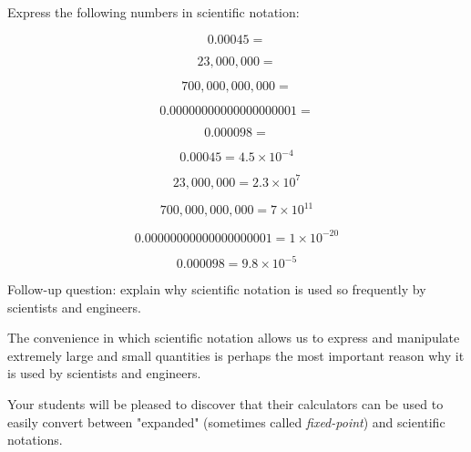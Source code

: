 

Express the following numbers in scientific notation:

$$0.00045 = $$

$$23,000,000 = $$

$$700,000,000,000 = $$

$$0.00000000000000000001 = $$

$$0.000098 = $$







$$0.00045 = 4.5 \times 10^{-4}$$

$$23,000,000 = 2.3 \times 10^{7}$$

$$700,000,000,000 = 7 \times 10^{11}$$

$$0.00000000000000000001 = 1 \times 10^{-20}$$

$$0.000098 = 9.8 \times 10^{-5}$$

\vskip 10pt

Follow-up question: explain why scientific notation is used so frequently by scientists and engineers.







The convenience in which scientific notation allows us to express and manipulate extremely large and small quantities is perhaps the most important reason why it is used by scientists and engineers.

Your students will be pleased to discover that their calculators can be used to easily convert between "expanded" (sometimes called {\it fixed-point}) and scientific notations.





